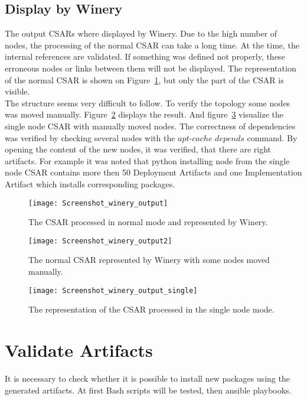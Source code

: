  \subsection*{Display by Winery}
 The output CSARs where displayed by Winery.
Due to the high number of nodes, the processing of the normal CSAR can take a long time. 
 At the time, the  internal references are validated.
 If something was defined not properly, these erroneous nodes or links between them will not be displayed.
The representation of the normal CSAR is shown on Figure~\ref{fig:winery_output}, but only the part of the CSAR is visible.\\
 The structure seems very difficult to follow.
 To verify the topology some nodes was moved manually. 
 Figure~\ref{fig:winery_output2} displays the result. 
 And figure~\ref{fig:winery_output_single} visualize the single node CSAR with manually moved nodes. 
 The correctness of dependencies was verified by checking several nodes with the $apt$-$cache$ $depends$ command.
 By opening the content of the new nodes, it was verified, that there are right artifacts.
 For example it was noted that python installing node from the single node CSAR contains more then 50 Deployment Artifacts and one Implementation Artifact which installs corresponding packages.
 \begin{figure}[ht]   
 	\centering
 	\texttt{[image: Screenshot\_winery\_output]}  
 	\caption{The CSAR processed in normal mode and represented by Winery.}
 	\label{fig:winery_output}
 \end{figure}
 \begin{figure}[ht]   
 	\centering
 	\texttt{[image: Screenshot\_winery\_output2]}
 	\caption{The normal CSAR represented by Winery with some nodes moved manually.}
 	\label{fig:winery_output2}
 \end{figure}
\begin{figure}[ht]   
	\centering
	\texttt{[image: Screenshot\_winery\_output\_single]}
	\caption{The representation of the CSAR processed in the single node mode.}
	\label{fig:winery_output_single}
\end{figure}
\section{Validate Artifacts}\label{sec:checkart}
It is necessary to check whether it is possible to install new packages using the generated artifacts.
At first Bash scripts will be tested, then ansible playbooks.

